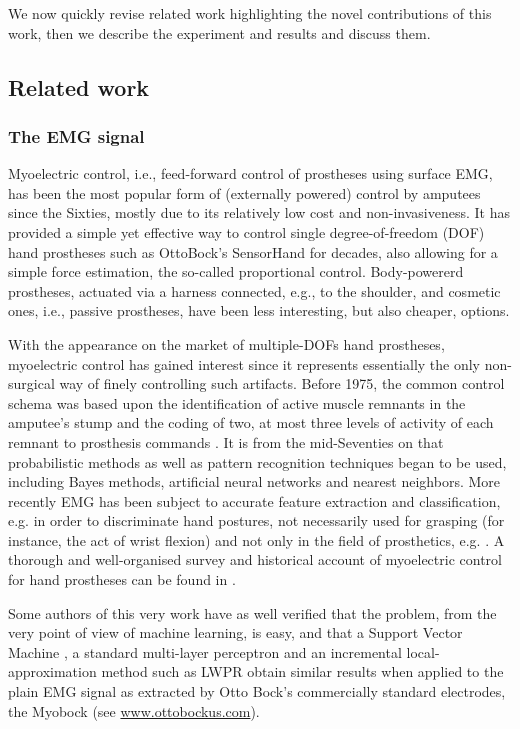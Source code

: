 We now quickly revise related work highlighting the novel contributions of this
work, then we describe the experiment and results and discuss them.

\subsection{Related work}

\subsubsection{The EMG signal}

Myoelectric control, i.e., feed-forward control of prostheses using surface EMG,
has been the most popular form of (externally powered) control by amputees since
the Sixties, mostly due to its relatively low cost and non-invasiveness. It has
provided a simple yet effective way to control single degree-of-freedom (DOF) hand
prostheses such as OttoBock's SensorHand for decades, also allowing for a simple
force estimation, the so-called proportional control. Body-powererd prostheses,
actuated via a harness connected, e.g., to the shoulder, and cosmetic ones, i.e.,
passive prostheses, have been less interesting, but also cheaper, options.

With the appearance on the market of multiple-DOFs hand prostheses, myoelectric
control has gained interest since it represents essentially the only non-surgical
way of finely controlling such artifacts. Before 1975, the common
control schema was based upon the identification of active muscle remnants in the
amputee's stump and the coding of two, at most three levels of activity of each
remnant to prosthesis commands \cite{bottomley65,childress69}. It is from the mid-Seventies
on that probabilistic methods as well as pattern recognition techniques began to be used,
including Bayes methods, artificial neural networks and nearest neighbors. More recently
EMG has been subject to accurate feature extraction and classification,
e.g. \cite{englehart01,dunlop,smagt06} in order to discriminate hand postures, not necessarily
used for grasping (for instance, the act of wrist flexion) and not only in the field
of prosthetics, e.g. \cite{fukuda,yokoi}. A thorough and well-organised survey and
historical account of myoelectric control for hand prostheses can be found in
\cite{englehart06}.

Some authors of this very work \cite{2008.ICRA,2008.BioCyb} have as well verified that the problem, from
the very point of view of machine learning, is easy, and that a Support Vector Machine
\cite{BGV92}, a standard multi-layer perceptron and an incremental local-approximation
method such as LWPR \cite{lwpr} obtain similar results when applied to the plain EMG
signal as extracted by Otto Bock's commercially standard electrodes, the Myobock
(see \url{www.ottobockus.com}).


